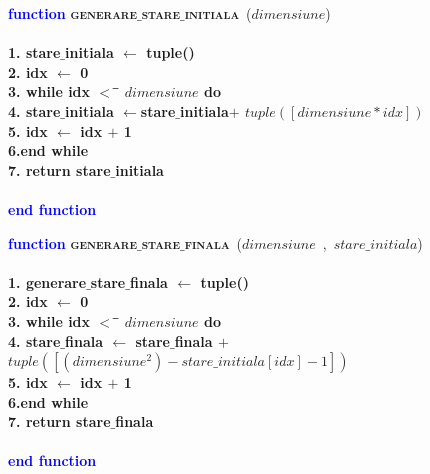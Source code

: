 \documentclass{article}
\begin{document}
\vspace{1cm}
\begin{center}
\begin{tabbing}
\large
\indent\textbf{\textcolor{blue}{func}}\=\textbf{\textcolor{blue}{tion}}
\textsc{\bfseries{generare$\_$stare$\_$initiala}}\ {($dimensiune$)}\\\\
\bfseries{1.}\indent \> stare$\_$initiala $\leftarrow$ tuple()\\
\bfseries{2.}\indent \> idx $\leftarrow$ 0 \\
\bfseries{3.}\indent\> \textbf{while} idx  $<$ \= $dimensiune$ \textbf{ do}\\
\bfseries{4.}\indent\>   \>stare$\_$initiala $\leftarrow$stare$\_$initiala$+$ $tuple([dimensiune*idx])$\\
\bfseries{5.}\indent\>   \>idx $\leftarrow$ idx $+$ 1\\
\bfseries{6.}\indent\>\textbf{end while}\\
\bfseries{7.}\indent\> \textbf{return} stare$\_$initiala\\\\
\indent\textbf{\textcolor{blue}{end }}\=\textbf{\textcolor{blue}{function}}
\end{tabbing}
\end{center}
\vspace{1cm}
\begin{center}
\begin{tabbing}
\large
\indent\textbf{\textcolor{blue}{func}}\=\textbf{\textcolor{blue}{tion}}
\textsc{\bfseries{generare$\_$stare$\_$finala}}\ {($dimensiune$\ ,\ $stare\_initiala$)}\\\\
\bfseries{1.}\indent \> generare$\_$stare$\_$finala $\leftarrow$ tuple()\\
\bfseries{2.}\indent \> idx $\leftarrow$ 0 \\
\bfseries{3.}\indent\> \textbf{while} idx  $<$ \= $dimensiune$ \textbf{ do}\\
\bfseries{4.}\indent\>   \>stare$\_$finala $\leftarrow$ stare$\_$finala $+$ $tuple([(dimensiune^2)-stare\_initiala[idx]-1])$\\
\bfseries{5.}\indent\>   \>idx $\leftarrow$ idx $+$ 1\\
\bfseries{6.}\indent\>\textbf{end while}\\
\bfseries{7.}\indent\> \textbf{return} stare$\_$finala\\\\
\indent\textbf{\textcolor{blue}{end }}\=\textbf{\textcolor{blue}{function}}
\end{tabbing}
\end{center}
\end{document}
